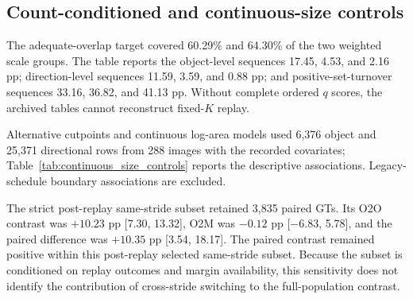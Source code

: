 \documentclass[preprint,10pt]{elsarticle}
\begin{document}
\subsection{Count-conditioned and continuous-size controls}

\begin{table}[ht]
\centering
\caption{O2M positive-count controls on common-valid equivalent-area-side support. Exact-$K=3$--7 is the adequate-overlap set with at least 20 raw GTs from each size group at every retained count. Full-support crude, overlap-support crude, and overlap-support standardised estimates separate support restriction from count-composition standardisation. Intervals use 5,000 stratified image-cluster bootstrap replicates.}
\resizebox{\textwidth}{!}{}
\end{table}

The adequate-overlap target covered 60.29\% and 64.30\% of the two weighted scale groups. The table reports the object-level sequences 17.45, 4.53, and 2.16 pp; direction-level sequences 11.59, 3.59, and 0.88 pp; and positive-set-turnover sequences 33.16, 36.82, and 41.13 pp. Without complete ordered $q$ scores, the archived tables cannot reconstruct fixed-$K$ replay.

Alternative cutpoints and continuous log-area models used 6,376 object and 25,371 directional rows from 288 images with the recorded covariates; Table~\ref{tab:continuous_size_controls} reports the descriptive associations. Legacy-schedule boundary associations are excluded.

\begin{table}[ht]
\centering
\caption{Cutpoint and continuous-size controls on common-valid equivalent-area-side support. Panel A reports upper-minus-lower fragility gaps at cutpoint $c$ among objects with equivalent-area side in $[8,32)$ px. Panel B reports adjusted probability changes per area doubling from sampling-weighted linear probability models. Intervals use 2,000 stratified image-cluster bootstrap replicates.}
\label{tab:continuous_size_controls}

\end{table}


The strict post-replay same-stride subset retained 3,835 paired GTs. Its O2O contrast was $+10.23$ pp [7.30, 13.32], O2M was $-0.12$ pp [$-6.83$, 5.78], and the paired difference was $+10.35$ pp [3.54, 18.17]. The paired contrast remained positive within this post-replay selected same-stride subset. Because the subset is conditioned on replay outcomes and margin availability, this sensitivity does not identify the contribution of cross-stride switching to the full-population contrast.
\end{document}
